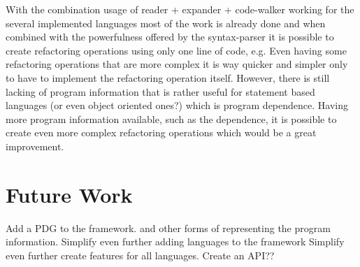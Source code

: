 With the combination usage of reader + expander + code-walker working for the several
implemented languages most of the work is already done and when combined with the
powerfulness offered by the syntax-parser it is possible to create refactoring operations
using only one line of code, e.g. %
Even having some refactoring operations that are more complex it is way quicker and
simpler only to have to implement the refactoring operation itself.
However, there is still lacking of program information that is rather useful for
statement based languages (or even object oriented ones?) which is program dependence.
Having more program information available, such as the dependence, it is possible to
create even more complex refactoring operations which would be a great improvement.



\section{Future Work}
Add a PDG to the framework. and other forms of representing the program information.
Simplify even further adding languages to the framework
Simplify even further create features for all languages.
Create an API??
